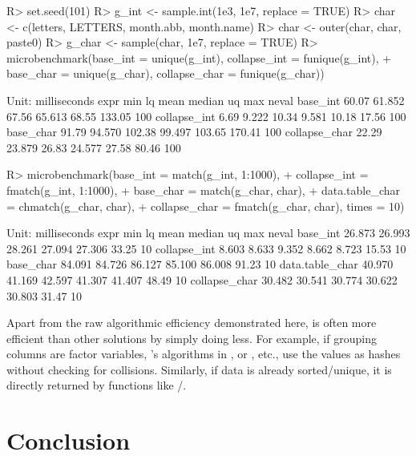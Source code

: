 \documentclass[article]{jss}
\begin{document}
\begin{Schunk}
\begin{Sinput}
R> set.seed(101)
R> g_int <- sample.int(1e3, 1e7, replace = TRUE)
R> char <- c(letters, LETTERS, month.abb, month.name)
R> char <- outer(char, char, paste0)
R> g_char <- sample(char, 1e7, replace = TRUE)
R> microbenchmark(base_int = unique(g_int), collapse_int = funique(g_int),
+              base_char = unique(g_char), collapse_char = funique(g_char))
\end{Sinput}
\begin{Soutput}
Unit: milliseconds
          expr   min     lq   mean median     uq    max neval
      base_int 60.07 61.852  67.56 65.613  68.55 133.05   100
  collapse_int  6.69  9.222  10.34  9.581  10.18  17.56   100
     base_char 91.79 94.570 102.38 99.497 103.65 170.41   100
 collapse_char 22.29 23.879  26.83 24.577  27.58  80.46   100
\end{Soutput}
\begin{Sinput}
R> microbenchmark(base_int = match(g_int, 1:1000),
+                 collapse_int = fmatch(g_int, 1:1000),
+                 base_char = match(g_char, char),
+                 data.table_char = chmatch(g_char, char),
+                 collapse_char = fmatch(g_char, char), times = 10)
\end{Sinput}
\begin{Soutput}
Unit: milliseconds
            expr    min     lq   mean median     uq   max neval
        base_int 26.873 26.993 28.261 27.094 27.306 33.25    10
    collapse_int  8.603  8.633  9.352  8.662  8.723 15.53    10
       base_char 84.091 84.726 86.127 85.100 86.008 91.23    10
 data.table_char 40.970 41.169 42.597 41.307 41.407 48.49    10
   collapse_char 30.482 30.541 30.774 30.622 30.803 31.47    10
\end{Soutput}
\end{Schunk}
%
Apart from the raw algorithmic efficiency demonstrated here,  is often more efficient than other solutions by simply doing less. For example, if grouping columns are factor variables, 's algorithms in ,  or , etc., use the values as hashes without checking for collisions. Similarly, if data is already sorted/unique, it is directly returned by functions like /.

\newpage

\section{Conclusion} \label{sec:conclusion}
\end{document}
